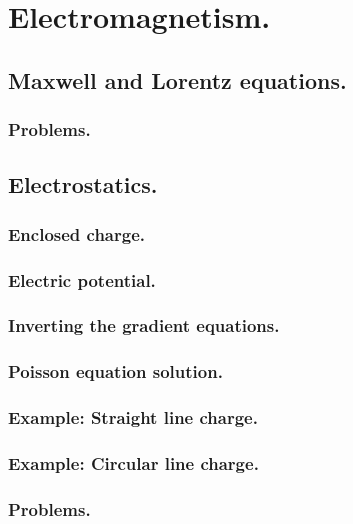 %
%
   \chapter{Electromagnetism.}
      \section{Maxwell and Lorentz equations.}
         
         \subsection{Problems.}
            
      \section{Electrostatics.}
         
         \subsection{Enclosed charge.}
            
         \subsection{Electric potential.}
            
         \subsection{Inverting the gradient equations.}
            
         \subsection{Poisson equation solution.}
            
         \subsection{Example: Straight line charge.}
            
         \subsection{Example: Circular line charge.}
            
         \subsection{Problems.}
            
